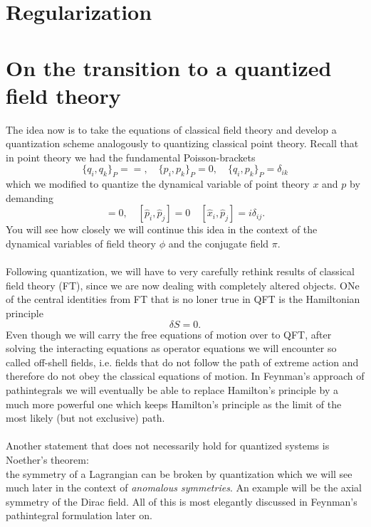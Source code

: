 \section{Regularization}


\section{On the transition to a quantized field theory}
The idea now is to take the equations of classical field theory and develop a quantization scheme analogously to quantizing classical point theory. Recall that in point theory we had the fundamental Poisson-brackets
\begin{equation}
	\{q_i,q_k\}_P==, \quad \{p_i,p_k\}_P=0,\quad \{q_i,p_k\}_P=\delta_{ik}
\end{equation}
which we modified to quantize the dynamical variable of point theory $x$ and $p$ by demanding
\begin{equation}
	[\hat{ x}_i,\hat{ x}_j]=0,\quad [\hat{p}_i,\hat{p}_j]=0\quad [\hat{ x}_i,\hat{p}_j]=i\delta_{ij}.
\end{equation}
You will see how closely we will continue this idea in the context of the dynamical variables of field theory $\phi$ and the conjugate field $\pi$.\\
\\
Following quantization, we will have to very carefully rethink results of classical field theory (FT), since we are now dealing with completely altered objects. ONe of the central identities from FT that is no loner true in QFT is the Hamiltonian principle
\begin{equation}
	\delta S=0.
\end{equation}
Even though we will carry the free equations of motion over to QFT, after solving the interacting equations as operator equations we will encounter so called off-shell fields, i.e. fields that do not follow the path of extreme action and therefore do not obey the classical equations of motion. In Feynman's approach of pathintegrals we will eventually be able to replace Hamilton's principle by a much more powerful one which keeps Hamilton's principle as the limit of the most likely (but not exclusive) path.\\
\\
Another statement that does not necessarily hold for quantized systems is Noether's theorem: \\
the symmetry of a Lagrangian can be broken by quantization which we will see much later in the context of \emph{anomalous symmetries}. An example will be the axial symmetry of the Dirac field. All of this is most elegantly discussed in Feynman's pathintegral formulation later on.
